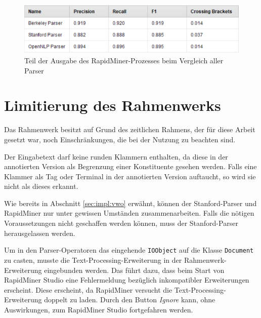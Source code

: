 \begin{figure}
\includegraphics[width=\textwidth]{gfx/shortresults.png} 
\caption{Teil der Ausgabe des RapidMiner-Prozesses beim Vergleich aller Parser}	
\label{fig:results}	
\end{figure}

\section{Limitierung des Rahmenwerks}

Das Rahmenwerk besitzt auf Grund des zeitlichen Rahmens, der für diese Arbeit gesetzt war, noch Einschränkungen, die bei der Nutzung zu beachten sind. 

Der Eingabetext darf keine runden Klammern enthalten, da diese in der annotierten Version als Begrenzung einer Konstituente gesehen werden. Falls eine Klammer als Tag oder Terminal in der annotierten Version auftaucht, so wird sie nicht als dieses erkannt. 

Wie bereits in Abschnitt \ref{sec:impl:vwo} erwähnt, können der Stanford-Parser und RapidMiner nur unter gewissen Umständen zusammenarbeiten. Falls die nötigen Voraussetzungen nicht geschaffen werden können, muss der Stanford-Parser herausgelassen werden.

Um in den Parser-Operatoren das eingehende \texttt{IOObject} auf die Klasse \texttt{Document} zu casten, musste die Text-Processing-Erweiterung in der Rahmenwerk-Erweiterung eingebunden werden. Das führt dazu, dass beim Start von RapidMiner Studio eine Fehlermeldung bezüglich inkompatibler Erweiterungen erscheint. Diese erscheint, da RapidMiner versucht die Text-Processing-Erweiterung doppelt zu laden. Durch den Button \textit{Ignore} kann, ohne Auswirkungen, zum RapidMiner Studio fortgefahren werden.
 